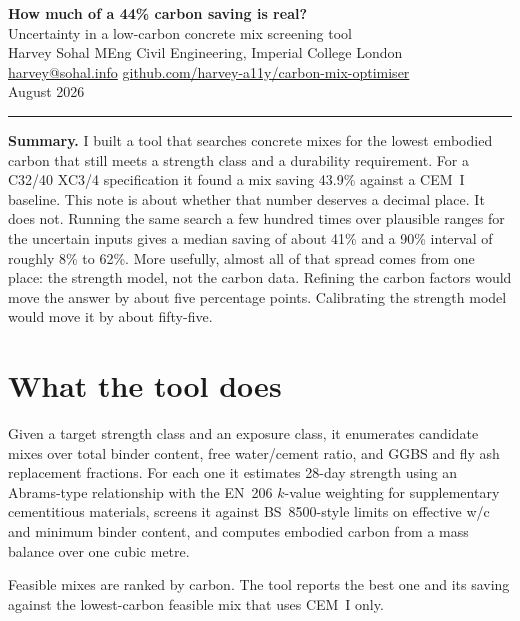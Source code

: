 \documentclass[11pt,a4paper]{article}
\begin{document}
\begin{center}
  {\LARGE\bfseries How much of a 44\% carbon saving is real?}\\[6pt]
  {\large Uncertainty in a low-carbon concrete mix screening tool}\\[10pt]
  {\normalsize Harvey Sohal \quad\textbullet\quad MEng Civil Engineering, Imperial College London}\\[2pt]
  {\small \href{mailto:harvey@sohal.info}{harvey@sohal.info} \quad\textbullet\quad
   \href{https://github.com/harvey-a11y/carbon-mix-optimiser}{github.com/harvey-a11y/carbon-mix-optimiser}}\\[2pt]
  {\small August 2026}
\end{center}

\vspace{0.6em}
\hrule
\vspace{0.8em}

\textbf{Summary.} I built a tool that searches concrete mixes for the lowest embodied carbon
that still meets a strength class and a durability requirement. For a C32/40 XC3/4 specification
it found a mix saving 43.9\% against a CEM~I baseline. This note is about whether that number
deserves a decimal place. It does not. Running the same search a few hundred times over
plausible ranges for the uncertain inputs gives a median saving of about 41\% and a 90\%
interval of roughly 8\% to 62\%. More usefully, almost all of that spread comes from one place:
the strength model, not the carbon data. Refining the carbon factors would move the answer by
about five percentage points. Calibrating the strength model would move it by about fifty-five.

\section{What the tool does}

Given a target strength class and an exposure class, it enumerates candidate mixes over total
binder content, free water/cement ratio, and GGBS and fly ash replacement fractions. For each
one it estimates 28-day strength using an Abrams-type relationship with the EN~206 $k$-value
weighting for supplementary cementitious materials, screens it against BS~8500-style limits on
effective w/c and minimum binder content, and computes embodied carbon from a mass balance over
one cubic metre.

Feasible mixes are ranked by carbon. The tool reports the best one and its saving against the
lowest-carbon feasible mix that uses CEM~I only.
\end{document}

